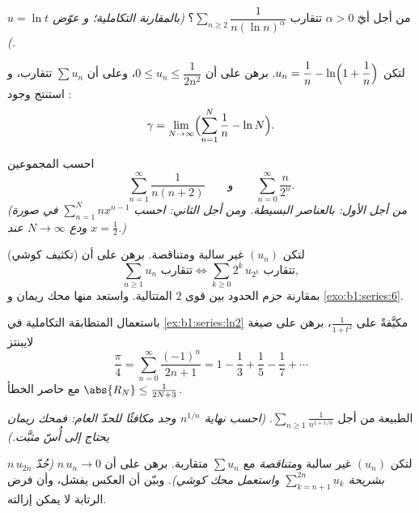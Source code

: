 \begin{exercise}[$\star\star$]\label{exo:b1:series:6}
من أجل أيّ $\alpha > 0$ تتقارب $\sum_{n \geq 2}
\dfrac{1}{n (\ln n)^{\alpha}}$؟ \emph{(بالمقارنة التكاملية؛ و
عوّض $u = \ln t$.)}
\end{exercise}

\begin{exercise}[$\star\star$]\label{exo:b1:series:7}
لتكن $u_n = \dfrac{1}{n} - \ln\Bigl(1 + \dfrac1n\Bigr)$. برهن على أن
$0 \leq u_n \leq \dfrac{1}{2n^2}$، وعلى أن $\sum u_n$ تتقارب، و
استنتج وجود :
\[
\gamma = \lim_{N \to \infty} \Bigl( \sum_{n=1}^{N} \frac 1n - \ln N
\Bigr) .
\]
\end{exercise}

\begin{exercise}[$\star\star$]\label{exo:b1:series:8}
احسب المجموعين
\[
\sum_{n=1}^{\infty} \frac{1}{n(n+2)}
\qquad\text{و}\qquad
\sum_{n=0}^{\infty} \frac{n}{2^n} .
\]
\emph{(من أجل الأول: بالعناصر البسيطة. ومن أجل الثاني: احسب
$\sum_{n=1}^{N} n x^{n-1}$ في صورة  ودع $N \to \infty$ عند
$x = \frac12$.)}
\end{exercise}

\begin{exercise}[$\star\star\star$]\label{exo:b1:series:9}
(تكثيف كوشي) لتكن $(u_n)$ غير سالبة ومتناقصة.
برهن على أن
\[
\sum_{n \geq 1} u_n \text{ تتقارب}
\iff
\sum_{k \geq 0} 2^k\, u_{2^k} \text{ تتقارب},
\]
بمقارنة حزم الحدود بين قوى $2$ المتتالية.
واستعد منها محك ريمان و
\cref{exo:b1:series:6}.
\end{exercise}

\begin{exercise}[$\star\star\star$]\label{exo:b1:series:10}
باستعمال المتطابقة التكاملية في \cref{ex:b1:series:ln2} مكيَّفةً على
$\frac{1}{1+t^2}$، برهن على صيغة لايبنتز
\[
\frac{\pi}{4} = \sum_{n=0}^{\infty} \frac{(-1)^n}{2n+1}
= 1 - \frac13 + \frac15 - \frac17 + \cdots
\]
مع حاصر الخطأ $\abs{R_N} \leq \frac{1}{2N+3}$.
\end{exercise}

\begin{exercise}[$\star\star$]\label{exo:b1:series:11}
الطبيعة من أجل $\displaystyle\sum_{n \geq 1} \frac{1}{n^{1 + 1/n}}$.
\emph{(احسب نهاية $n^{1/n}$ وجد مكافئًا للحدّ
العام: فمحك ريمان يحتاج إلى أُسّ \emph{مثبَّت}.)}
\end{exercise}

\begin{exercise}[$\star\star\star$]\label{exo:b1:series:12}
لتكن $(u_n)$ غير سالبة و\emph{متناقصة} مع $\sum u_n$
متقاربة. برهن على أن $n\,u_n \to 0$ \emph{(حُدّ $n\,u_{2n}$
بشريحة $\sum_{k=n+1}^{2n} u_k$ واستعمل محك
كوشي)}. وبيّن أن العكس يفشل، وأن فرض
الرتابة لا يمكن إزالته.
\end{exercise}

